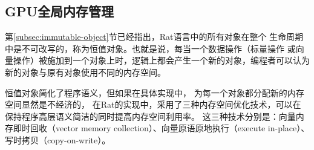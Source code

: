\subsection{GPU全局内存管理}

第\ref{subsec:immutable-object}节已经指出，Rat语言中的所有对象在整个
生命周期中是不可改写的，称为恒值对象。也就是说，每当一个数据操作（标量操作
或向量操作）被施加到一个对象上时，逻辑上都会产生一个新的对象，编程者可以认为
新的对象与原有对象使用不同的内存空间。

恒值对象简化了程序语义，但如果在具体实现中，
为每一个对象都分配新的内存空间显然是不经济的，
在Rat的实现中，采用了三种内存空间优化技术，可以在
保持程序高层语义简洁的同时提高内存空间利用率。
这三种技术分别是：向量内存即时回收（vector memory collection）、向量原语原地执行（execute in-place）、
写时拷贝（copy-on-write）。

